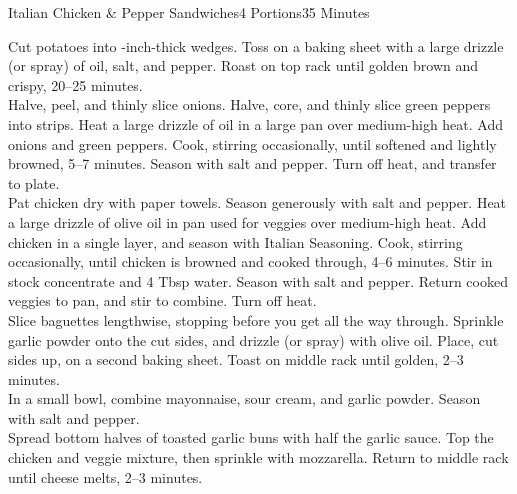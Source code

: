\begin{recipe}{Italian Chicken \& Pepper Sandwiches}{4 Portions}{35 Minutes}

Cut potatoes into -inch-thick wedges. Toss on a baking sheet with a large drizzle (or spray) of oil, salt, and pepper. Roast on top rack until golden brown and crispy, 20--25 minutes.\\

\newstep
{}
Halve, peel, and thinly slice onions. Halve, core, and thinly slice green peppers into strips. Heat a large drizzle of oil in a large pan over medium-high heat. Add onions and green peppers. Cook, stirring occasionally, until softened and lightly browned, 5--7 minutes. Season with salt and pepper. Turn off heat, and transfer to plate.\\

\newstep
{}
Pat chicken dry with paper towels. Season generously with salt and pepper. Heat a large drizzle of olive oil in pan used for veggies over medium-high heat. Add chicken in a single layer, and season with Italian Seasoning. Cook, stirring occasionally, until chicken is browned and cooked through, 4--6 minutes. Stir in stock concentrate and 4 Tbsp water. Season with salt and pepper. Return cooked veggies to pan, and stir to combine. Turn off heat.\\

\newstep
{}
Slice baguettes lengthwise, stopping before you get all the way through. Sprinkle garlic powder onto the cut sides, and drizzle (or spray) with olive oil. Place, cut sides up, on a second baking sheet. Toast on middle rack until golden, 2--3 minutes.\\

\newstep
{}
In a small bowl, combine mayonnaise, sour cream, and garlic powder. Season with salt and pepper.\\

\newstep
{}
Spread bottom halves of toasted garlic buns with half the garlic sauce. Top the chicken and veggie mixture, then sprinkle with mozzarella. Return to middle rack until cheese melts, 2--3 minutes.

\end{recipe}

